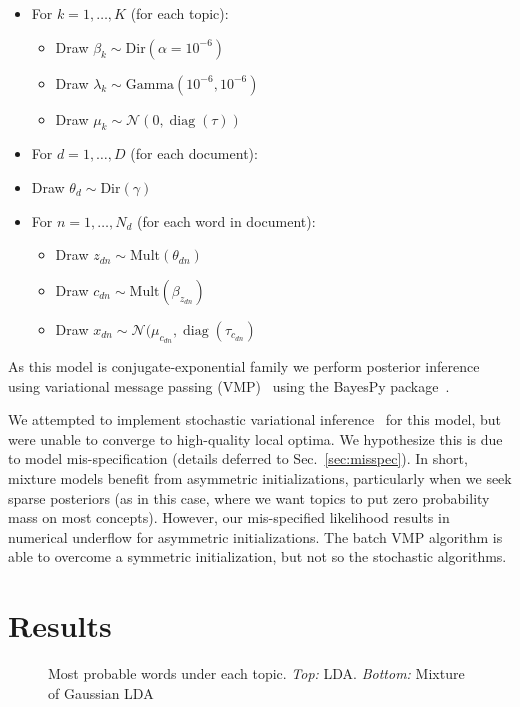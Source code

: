 \documentclass[11pt]{article}
\DeclareMathOperator{\diag}{diag}
\begin{document}
\begin{itemize}
\item For $k = 1, \ldots, K$ (for each topic):
  \begin{itemize}
    \item Draw $\beta_k \sim \mbox{Dir}(\alpha=10^{-6})$
    \item Draw $\lambda_k \sim \mbox{Gamma}(10^{-6}, 10^{-6})$
    \item Draw $\mu_k \sim \mathcal{N}(0, \diag(\tau))$
  \end{itemize}
\item For $d = 1, \ldots, D$ (for each document):
  \item Draw $\theta_d \sim \mbox{Dir}(\gamma)$
  \item For $n = 1, \ldots, N_d$ (for each word in document):
  \begin{itemize}
    \item Draw $z_{dn} \sim \mbox{Mult}(\theta_{dn})$
    \item Draw $c_{dn} \sim \mbox{Mult}(\beta_{z_{dn}})$
    \item Draw $x_{dn} \sim \mathcal{N}(\mu_{c_{dn}}, \diag(\tau_{c_{dn}})$
  \end{itemize}
\end{itemize}

As this model is conjugate-exponential family we perform posterior inference using variational message passing (VMP)~\cite{Winn05} using the BayesPy package~\cite{Luttinen14}.

We attempted to implement stochastic variational inference~\cite{Hoffman13} for this model, but were unable to converge to high-quality local optima. We hypothesize this is due to model mis-specification (details deferred to Sec.~\ref{sec:misspec}). In short, mixture models benefit from asymmetric initializations, particularly when we seek sparse posteriors (as in this case, where we want topics to put zero probability mass on most concepts). However, our mis-specified likelihood results in numerical underflow for asymmetric initializations. The batch VMP algorithm is able to overcome a symmetric initialization, but not so the stochastic algorithms.

\section{Results}
\begin{figure}

\begin{itemize}
\end{itemize}

\begin{itemize}
\end{itemize}

\caption{\label{tbl:topics} Most probable words under each topic. \emph{Top:} LDA. \emph{Bottom:} Mixture of Gaussian LDA}
\end{figure}
\end{document}
